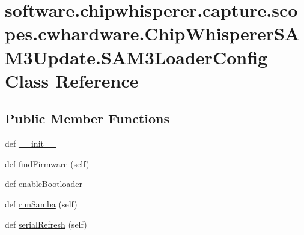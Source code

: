 \hypertarget{classsoftware_1_1chipwhisperer_1_1capture_1_1scopes_1_1cwhardware_1_1ChipWhispererSAM3Update_1_1SAM3LoaderConfig}{}\section{software.\+chipwhisperer.\+capture.\+scopes.\+cwhardware.\+Chip\+Whisperer\+S\+A\+M3\+Update.\+S\+A\+M3\+Loader\+Config Class Reference}
\label{classsoftware_1_1chipwhisperer_1_1capture_1_1scopes_1_1cwhardware_1_1ChipWhispererSAM3Update_1_1SAM3LoaderConfig}
\subsection*{Public Member Functions}
\begin{DoxyCompactItemize}
\item 
def \hyperlink{classsoftware_1_1chipwhisperer_1_1capture_1_1scopes_1_1cwhardware_1_1ChipWhispererSAM3Update_1_1SAM3LoaderConfig_a381309e722e08946a6c8397949cf07b0}{\+\_\+\+\_\+init\+\_\+\+\_\+}
\item 
def \hyperlink{classsoftware_1_1chipwhisperer_1_1capture_1_1scopes_1_1cwhardware_1_1ChipWhispererSAM3Update_1_1SAM3LoaderConfig_adcea155d6ca7dfd069080030e0464a5d}{find\+Firmware} (self)
\item 
def \hyperlink{classsoftware_1_1chipwhisperer_1_1capture_1_1scopes_1_1cwhardware_1_1ChipWhispererSAM3Update_1_1SAM3LoaderConfig_af04721d996f948673d8d63d5197d6e40}{enable\+Bootloader}
\item 
def \hyperlink{classsoftware_1_1chipwhisperer_1_1capture_1_1scopes_1_1cwhardware_1_1ChipWhispererSAM3Update_1_1SAM3LoaderConfig_ab4968b339a0dc4577ee923dfdafe51d1}{run\+Samba} (self)
\item 
def \hyperlink{classsoftware_1_1chipwhisperer_1_1capture_1_1scopes_1_1cwhardware_1_1ChipWhispererSAM3Update_1_1SAM3LoaderConfig_a8b9010d36fde24fc0fe913f557770cca}{serial\+Refresh} (self)
\end{DoxyCompactItemize}
